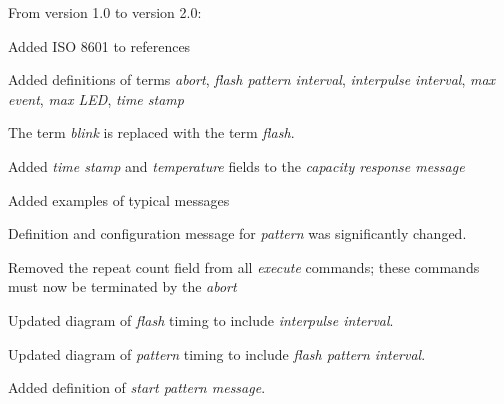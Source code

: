 \documentclass[letterpaper,11pt]{article}
\begin{document}
From version 1.0 to version 2.0:
\begin{compactitem}
  \item Added ISO 8601 to references
  \item Added definitions of terms \textit{abort}, \textit{flash pattern
    interval}, \textit{interpulse interval}, \textit{max event},
    \textit{max LED}, \textit{time stamp}
  \item The term \textit{blink} is replaced with the term \textit{flash}.
  \item Added \textit{time stamp} and \textit{temperature} fields to the
    \textit{capacity response message}
  \item Added examples of typical messages
  \item Definition and configuration message for \textit{pattern} was
    significantly changed.
  \item Removed the repeat count field from all \textit{execute} commands;
    these commands must now be terminated by the \textit{abort} 
  \item Updated diagram of \textit{flash} timing to include \textit{interpulse
        interval}.
  \item Updated diagram of \textit{pattern} timing to include \textit{flash
        pattern interval}.
  \item Added definition of \textit{start pattern message}.
\end{compactitem}
\end{document}
